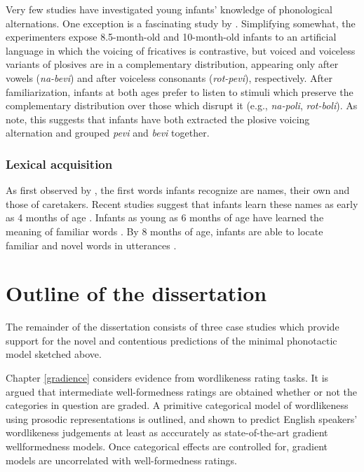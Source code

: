 Very few studies have investigated young infants' knowledge of phonological alternations. One exception is a fascinating study by \citet{White2008}. Simplifying somewhat, the experimenters expose 8.5-month-old and 10-month-old infants to an artificial language in which the voicing of fricatives is contrastive, but voiced and voiceless variants of plosives are in a complementary distribution, appearing only after vowels (\emph{na-bevi}) and after voiceless consonants (\emph{rot-pevi}), respectively. After familiarization, infants at both ages prefer to listen to stimuli which preserve the complementary distribution over those which disrupt it (e.g., \emph{na-poli}, \emph{rot-boli}). As \citeauthor{White2008} note, this suggests that infants have both extracted the plosive voicing alternation and grouped \emph{pevi} and \emph{bevi} together.

\subsubsection{Lexical acquisition}

As first observed by \citet{Darwin1877}, the first words infants recognize are names, their own and those of caretakers. Recent studies suggest that infants learn these names as early as 4 months of age \citep{Bortfeld2005,Mandel1995,Tincoff1999}. Infants as young as 6 months of age have learned the meaning of familiar words \citep{Bergelson2012}. By 8 months of age, infants are able to locate familiar and novel words in utterances \citep{Jusczyk1997,Seidl2006}.

\section{Outline of the dissertation}

The remainder of the dissertation consists of three case studies which provide support for the novel and contentious predictions of the minimal phonotactic model sketched above.

Chapter \ref{gradience} considers evidence from wordlikeness rating tasks. It is argued that intermediate well-formedness ratings are obtained whether or not the categories in question are graded. A primitive categorical model of wordlikeness using prosodic representations is outlined, and shown to predict English speakers' wordlikeness judgements at least as acccurately as state-of-the-art gradient wellformedness models. Once categorical effects are controlled for, gradient models are uncorrelated with well-formedness ratings.

